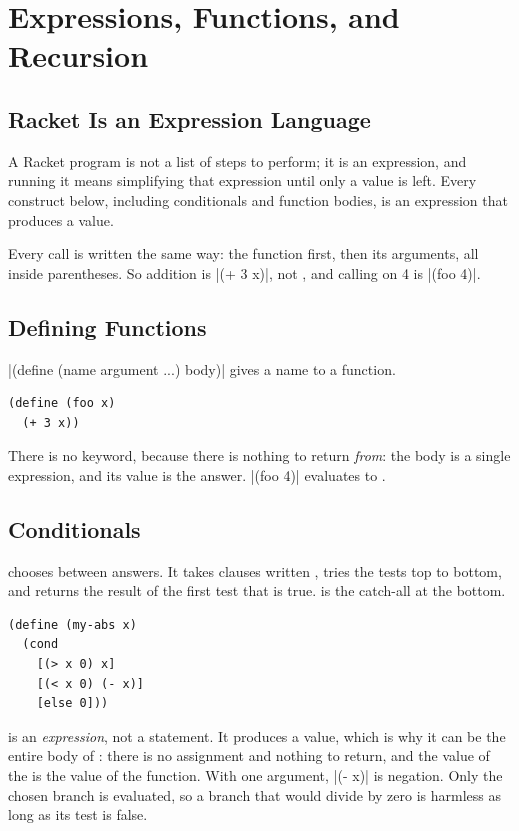 \section{Expressions, Functions, and Recursion}
\label{sec:exprrec}

\subsection{Racket Is an Expression Language}

A Racket program is not a list of steps to perform; it is an expression, and running it means simplifying that expression until only a value is left. Every construct below, including conditionals and function bodies, is an expression that produces a value.

Every call is written the same way: the function first, then its arguments, all inside parentheses. So addition is \rkt|(+ 3 x)|, not , and calling  on 4 is \rkt|(foo 4)|.

\subsection{Defining Functions}

\rkt|(define (name argument ...) body)| gives a name to a function.

\begin{lstlisting}
(define (foo x)
  (+ 3 x))
\end{lstlisting}

There is no  keyword, because there is nothing to return \emph{from}: the body is a single expression, and its value is the answer. \rkt|(foo 4)| evaluates to .

\subsection{Conditionals}

 chooses between answers. It takes clauses written , tries the tests top to bottom, and returns the result of the first test that is true.  is the catch-all at the bottom.

\begin{lstlisting}
(define (my-abs x)
  (cond
    [(> x 0) x]
    [(< x 0) (- x)]
    [else 0]))
\end{lstlisting}

 is an \emph{expression}, not a statement. It produces a value, which is why it can be the entire body of : there is no assignment and nothing to return, and the value of the  is the value of the function. With one argument, \rkt|(- x)| is negation. Only the chosen branch is evaluated, so a branch that would divide by zero is harmless as long as its test is false.

